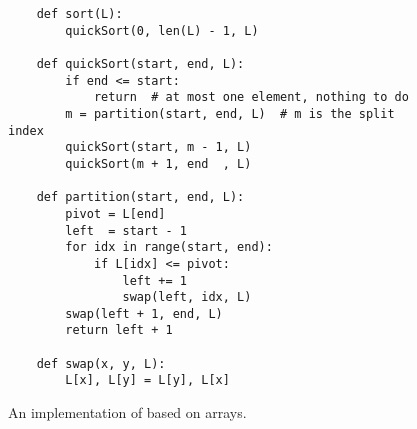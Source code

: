 \begin{figure}[!ht]
  \centering
\begin{verbatim}
    def sort(L):
        quickSort(0, len(L) - 1, L)
    
    def quickSort(start, end, L):
        if end <= start:
            return  # at most one element, nothing to do
        m = partition(start, end, L)  # m is the split index
        quickSort(start, m - 1, L)
        quickSort(m + 1, end  , L)
        
    def partition(start, end, L):
        pivot = L[end]
        left  = start - 1
        for idx in range(start, end):
            if L[idx] <= pivot:
                left += 1
                swap(left, idx, L)
        swap(left + 1, end, L)
        return left + 1
    
    def swap(x, y, L):
        L[x], L[y] = L[y], L[x]    
\end{verbatim}
\vspace*{-0.3cm}
  \caption{An implementation of  based on arrays.}
  \label{fig:quick-sort-array.stlx}
\end{figure}


